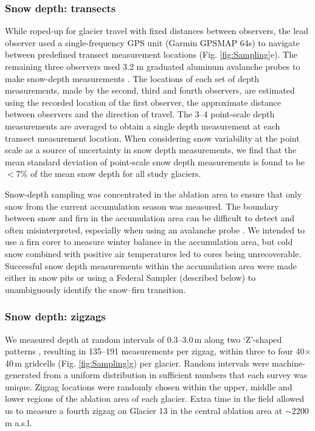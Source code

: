 \documentclass[twocolumn, letterpaper]{igs}
\begin{document}
\subsubsection{Snow depth: transects}

While roped-up for glacier travel with fixed distances between observers, the lead observer used a single-frequency GPS unit (Garmin GPSMAP 64s) to navigate between predefined transect measurement locations (Fig. \ref{fig:Sampling}e). The remaining three observers used 3.2 m graduated aluminum avalanche probes to make snow-depth measurements \citep{Kinar2015}. The locations of each set of depth measurements, made by the second, third and fourth observers, are estimated using the recorded location of the first observer, the approximate distance between observers and the direction of travel. The 3--4 point-scale depth measurements are averaged to obtain a single depth measurement at each transect measurement location. When considering snow variability at the point scale as a source of uncertainty in snow depth measurements, we find that the mean standard deviation of point-scale snow depth measurements is found to be $<$7\% of the mean snow depth for all study glaciers.

Snow-depth sampling was concentrated in the ablation area to ensure that only snow from the current accumulation season was measured. The boundary between snow and firn in the accumulation area can be difficult to detect and often misinterpreted, especially when using an avalanche probe \citep{Grunewald2010,Sold2013}. We intended to use a firn corer to measure winter balance in the accumulation area, but cold snow combined with positive air temperatures led to cores being unrecoverable. Successful snow depth measurements within the accumulation area were made either in snow pits or using a Federal Sampler (described below) to unambiguously identify the snow--firn transition. 

\subsubsection{Snow depth: zigzags}

We measured depth at random intervals of 0.3--3.0\,m along two `Z'-shaped patterns \citep{Shea2010}, resulting in 135--191 measurements per zigzag, within three to four 40$\times$40\,m gridcells (Fig. \ref{fig:Sampling}g) per glacier. Random intervals were machine-generated from a uniform distribution in sufficient numbers that each survey was unique. Zigzag locations were randomly chosen within the upper, middle and lower regions of the ablation area of each glacier. Extra time in the field allowed us to measure a fourth zigzag on Glacier 13 in the central ablation area at $\sim$2200 m a.s.l. 
\end{document}
